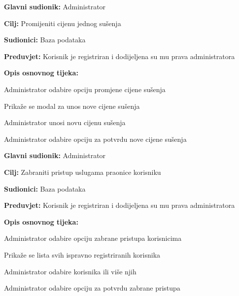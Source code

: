 \noindent {}
\begin{packed_item}
	
	\item \textbf{Glavni sudionik: } Administrator
	\item  \textbf{Cilj:} Promijeniti cijenu jednog sušenja
	\item  \textbf{Sudionici:} Baza podataka
	\item  \textbf{Preduvjet:} Korisnik je registriran i dodijeljena su mu prava administratora
	\item  \textbf{Opis osnovnog tijeka:}
	
	\item[] \begin{packed_enum}
		
		\item Administrator odabire opciju promjene cijene sušenja
		\item Prikaže se modal za unos nove cijene sušenja
		\item Administrator unosi novu cijenu sušenja
		\item Administrator odabire opciju za potvrdu nove cijene sušenja
	\end{packed_enum}
\end{packed_item}

\noindent {}
\begin{packed_item}
	
	\item \textbf{Glavni sudionik: } Administrator
	\item  \textbf{Cilj:} Zabraniti pristup uslugama praonice korisniku
	\item  \textbf{Sudionici:} Baza podataka
	\item  \textbf{Preduvjet:} Korisnik je registriran i dodijeljena su mu prava administratora
	\item  \textbf{Opis osnovnog tijeka:}
	
	\item[] \begin{packed_enum}
		
		\item Administrator odabire opciju zabrane pristupa korisnicima
		\item Prikaže se lista svih ispravno registriranih korisnika
		\item Administrator odabire korisnika ili više njih
		\item Administrator odabire opciju za potvrdu zabrane pristupa
	\end{packed_enum}
\end{packed_item}

